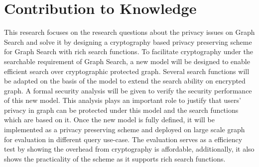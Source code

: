 \chapter{Contribution to Knowledge}
This research focuses on the research questions about the privacy issues on Graph Search and solve it by designing a cryptography based privacy preserving scheme for Graph Search with rich search functions. 
To facilitate cryptography under the searchable requirement of Graph Search, a new model will be designed to enable efficient search over cryptographic protected graph. Several search functions will be adapted on the basis of the model to extend the search ability on encrypted graph. 
A formal security analysis will be given to verify the security performance of this new model. This analysis plays an important role to justify that users' privacy in graph can be protected under this model and the search functions which are based on it. 
Once the new model is fully defined, it will be implemented as a privacy preserving scheme and deployed on large scale graph for evaluation in different query use-case. The evaluation serves as a efficiency test by showing the overhead from cryptography is affordable, additionally, it also shows the practicality of the scheme as it supports rich search functions.